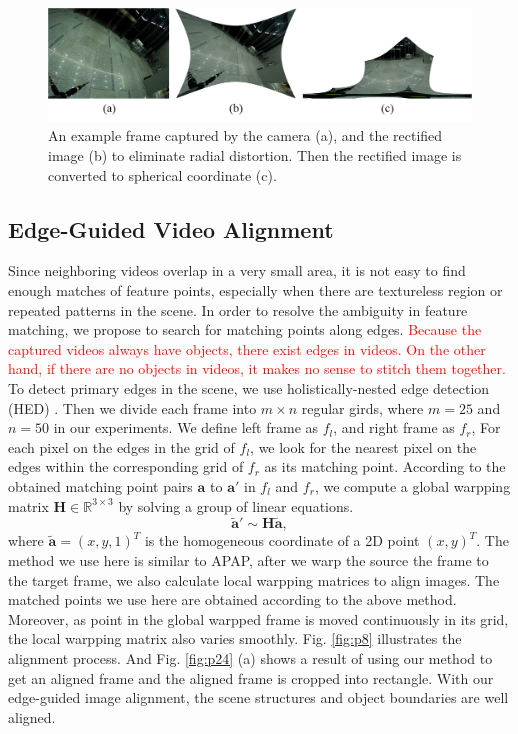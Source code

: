\documentclass[conference]{IEEEtran}
\begin{document}
\begin{figure}[t]
\centering
\includegraphics[scale=0.25]{picture57.png}
\caption{An example frame captured by the camera (a), and the rectified image (b) to eliminate radial distortion. Then the rectified image is converted to spherical coordinate (c).}
\label{fig:ori_cal_pro}
\end{figure}




\subsection{Edge-Guided Video Alignment}
\label{ssec:edge-detection}

Since neighboring videos overlap in a very small area, it is not easy to find enough matches of feature points, 
especially when there are textureless region or repeated patterns in the scene. 
In order to resolve the ambiguity in feature matching, we propose to search for matching points along edges.
\textcolor{red}{Because the captured videos always have objects, there exist edges in videos. 
On the other hand, if there are no objects in videos, it makes no sense to stitch them together.}
To detect primary edges in the scene, we use holistically-nested edge detection (HED) \cite{xie2015holistically}. 
Then we divide each frame into $m \times n$ regular girds, where $m=25$ and $n=50$ in our experiments.
We define left frame as $f_l$, and right frame as $f_r$,
For each pixel on the edges in the grid of $f_l$, we look for the nearest pixel on the edges within the corresponding grid of $f_r$ as its matching point.
According to the obtained matching point pairs $\mathbf{a}$ to $\mathbf{a}'$ in $f_l$ and $f_r$, 
we compute a global warpping matrix $\mathbf{H} \in \mathbb{R}^{3 \times 3}$ by solving a group of linear equations.
\begin{equation}
\widetilde{\textbf{a}}' \sim \mathbf{H} \widetilde{\textbf{a}},
\end{equation}
where $\widetilde{\mathbf{a}}=(x,y,1)^{T}$ is the homogeneous coordinate of a 2D point $(x,y)^{T}$.
The method we use here is similar to APAP, after we warp the source the frame to the target frame, we also calculate local warpping matrices to align images.
The matched points we use here are obtained according to the above method. 
Moreover, as point in the global warpped frame is moved continuously in its grid, the local warpping matrix also varies smoothly.
Fig. \ref{fig:p8} illustrates the alignment process. And Fig. \ref{fig:p24} (a) shows a result of using our method to get an aligned frame 
and the aligned frame is cropped into rectangle.
With our edge-guided image alignment, the scene structures and object boundaries are well aligned. 
\end{document}
